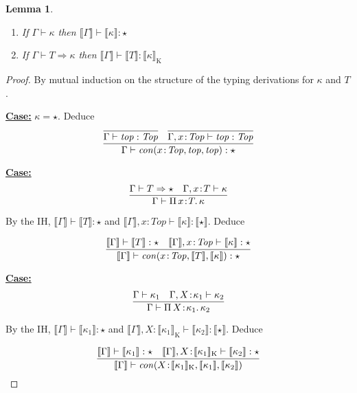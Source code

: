 \documentclass{article}
\newcommand{\abs}[4]{{#1}\, #2\! : \! #3.\, #4}
\newcommand{\interp}[1]{\llbracket #1 \rrbracket}
\newcommand{\tpsynth}[0]{\Rightarrow}
\newcommand{\startcase}[1]{\vspace{#1} \noindent\textbf{\underline{Case:}}}
\newtheorem{lemma}[theorem]{Lemma}
\begin{document}
\begin{lemma}
  \label{thm:stlc-static-sound}
  \ 
  \begin{enumerate}
  \item If \(\Gamma \vdash \kappa\) then \(\interp{\Gamma} \vdash
    \interp{\kappa} : \star\)
    
  \item If \(\Gamma \vdash T \tpsynth \kappa\) then \(\interp{\Gamma} \vdash
    \interp{T} : \interp{\kappa}_{\text{K}}\)
  \end{enumerate}
\end{lemma}
\begin{proof}
  By mutual induction on the structure of the typing derivations for \(\kappa\) and \(T\).

  \startcase{.2cm} \(\kappa = \star\).
  Deduce
  \[
    \infer{
      \Gamma \vdash \mathit{con}(x\!:\!\mathit{Top},\mathit{top},\mathit{top}) : \star
    }{
      \infer{\Gamma \vdash \mathit{top} : \mathit{Top}}{}
      \quad \infer{\Gamma,x\!:\!\mathit{Top} \vdash \mathit{top} : \mathit{Top}}{}
    }
  \]

  \startcase{.2cm} \[
    \infer{
      \Gamma \vdash \abs{\Pi}{x}{T}{\kappa}
    }{
      \Gamma \vdash T \tpsynth \star
      \quad \Gamma,x\!:\!T \vdash \kappa
    }
  \]

  By the IH, \(\interp{\Gamma} \vdash \interp{T} : \star\) and
  \(\interp{\Gamma},x\!:\!\mathit{Top} \vdash \interp{\kappa} :
  \interp{\star}\).
  Deduce

  \[
    \infer{
      \interp{\Gamma} \vdash \mathit{con}(x\!:\!\mathit{Top},\interp{T},\interp{\kappa})
      : \star
    }{
      \interp{\Gamma} \vdash \interp{T} : \star
      \quad \interp{\Gamma},x\!:\!\mathit{Top} \vdash \interp{\kappa} : \star
    }
  \]

  \startcase{.2cm} \[
    \infer{
      \Gamma \vdash \abs{\Pi}{X}{\kappa_1}{\kappa_2}
    }{
      \Gamma \vdash \kappa_1
      \quad \Gamma,X\!:\!\kappa_1 \vdash \kappa_2
    }
  \]

  By the IH, \(\interp{\Gamma} \vdash \interp{\kappa_1} : \star\) and
  \(\interp{\Gamma},X\!:\!\interp{\kappa_1}_{\text{K}} \vdash \interp{\kappa_2} :
  \interp{\star}\).
  Deduce

  \[
    \infer{
      \interp{\Gamma} \vdash \mathit{con}(X\!:\!\interp{\kappa_1}_{\text{K}},\interp{\kappa_1},\interp{\kappa_2})
    }{
      \interp{\Gamma} \vdash \interp{\kappa_1} : \star
      \quad \interp{\Gamma},X\!:\!\interp{\kappa_1}_{\text{K}} \vdash
      \interp{\kappa_2} : \star
    }
  \]
  

\end{proof}
\end{document}
